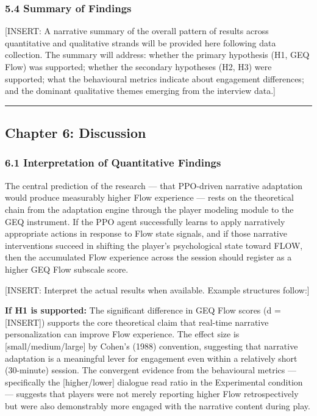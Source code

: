 \subsubsection{5.4 Summary of Findings}\label{summary-of-findings}

{[}INSERT: A narrative summary of the overall pattern of results across
quantitative and qualitative strands will be provided here following
data collection. The summary will address: whether the primary
hypothesis (H1, GEQ Flow) was supported; whether the secondary
hypotheses (H2, H3) were supported; what the behavioural metrics
indicate about engagement differences; and the dominant qualitative
themes emerging from the interview data.{]}

\begin{center}\rule{0.5\linewidth}{0.5pt}\end{center}

\subsection{Chapter 6: Discussion}\label{chapter-6-discussion}

\subsubsection{6.1 Interpretation of Quantitative
Findings}\label{interpretation-of-quantitative-findings}

The central prediction of the research --- that PPO-driven narrative
adaptation would produce measurably higher Flow experience --- rests on
the theoretical chain from the adaptation engine through the player
modeling module to the GEQ instrument. If the PPO agent successfully
learns to apply narratively appropriate actions in response to Flow
state signals, and if those narrative interventions succeed in shifting
the player's psychological state toward FLOW, then the accumulated Flow
experience across the session should register as a higher GEQ Flow
subscale score.

{[}INSERT: Interpret the actual results when available. Example
structures follow:{]}

\textbf{If H1 is supported:} The significant difference in GEQ Flow
scores (d = {[}INSERT{]}) supports the core theoretical claim that
real-time narrative personalization can improve Flow experience. The
effect size is {[}small/medium/large{]} by Cohen's (1988) convention,
suggesting that narrative adaptation is a meaningful lever for
engagement even within a relatively short (30-minute) session. The
convergent evidence from the behavioural metrics --- specifically the
{[}higher/lower{]} dialogue read ratio in the Experimental condition ---
suggests that players were not merely reporting higher Flow
retrospectively but were also demonstrably more engaged with the
narrative content during play.

